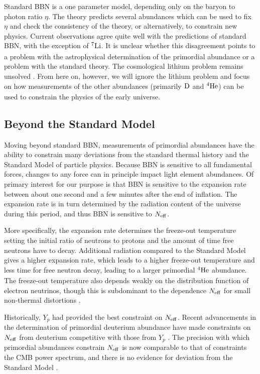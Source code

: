 Standard BBN is a one parameter model, depending only on the baryon to photon ratio $\eta$.  The theory predicts several abundances which can be used to fix $\eta$ and check the consistency of the theory, or alternatively, to constrain new physics.  Current observations agree quite well with the predictions of standard BBN, with the exception of $\nucl{7}{ }{Li}$.  It is unclear whether this disagreement points to a problem with the astrophysical determination of the primordial abundance or a problem with the standard theory.  The cosmological lithium problem remains unsolved \cite{Fields:2011zzb}.  From here on, however, we will ignore the lithium problem and focus on how measurements of the other abundances (primarily $\nucl{ }{ }{D}$ and $\nucl{4}{ }{He}$) can be used to constrain the physics of the early universe.








\subsection{Beyond the Standard Model}\label{BSM}
Moving beyond standard BBN, measurements of primordial abundances have the ability to constrain many deviations from the standard thermal history and the Standard Model of particle physics.  Because BBN is sensitive to all fundamental forces, changes to any force can in principle impact light element abundances.  Of primary interest for our purpose is that BBN is sensitive to the expansion rate between about one second and a few minutes after the end of inflation.  The expansion rate is in turn determined by the radiation content of the universe during this period, and thus BBN is sensitive to $N_{\rm eff}$.  

More specifically, the expansion rate determines the freeze-out temperature setting the initial ratio of neutrons to protons and the amount of time free neutrons have to decay.  Additional radiation compared to the Standard Model gives a higher expansion rate, which leads to a higher freeze-out temperature and less time for free neutron decay, leading to a larger primordial $\nucl{4}{ }{He}$ abundance.  The freeze-out temperature also depends weakly on the distribution function of electron neutrinos, though this is subdominant to the dependence $N_{\rm eff}$ for small non-thermal distortions \cite{Serpico:2004gx}.

Historically, $Y_p$ had provided the best constraint on $N_{\rm eff}$.  Recent advancements in the determination of primordial deuterium abundance have made constraints on $N_{\rm eff}$ from deuterium competitive with those from $Y_p$ \cite{Cooke:2013cba}.  The precision with which primordial abundances constrain $N_{\rm eff}$ is now comparable to that of constraints the CMB power spectrum, and there is no evidence for deviation from the Standard Model \cite{Ade:2015xua}.



